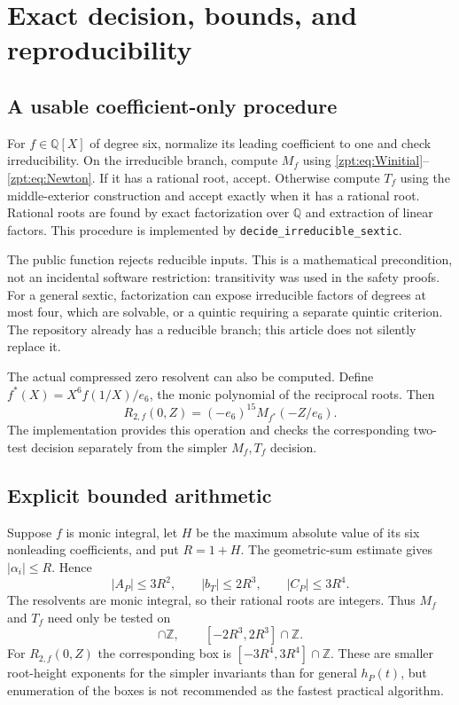 \documentclass[11pt,letterpaper]{article}
\numberwithin{equation}{section}
\theoremstyle{definition}
\theoremstyle{remark}
\newcommand{\QQ}{\mathbb Q}
\newcommand{\ZZ}{\mathbb Z}
\newcommand{\code}[1]{\texttt{\small #1}}
\begin{document}
\section{Exact decision, bounds, and reproducibility}
\label{zpt:sec:algorithm}
\subsection{A usable coefficient-only procedure}
For $f\in\QQ[X]$ of degree six, normalize its leading coefficient to one
and check irreducibility. On the irreducible branch, compute $M_f$ using
\eqref{zpt:eq:Winitial}--\eqref{zpt:eq:Newton}. If it has a rational root, accept.
Otherwise compute $T_f$ using the middle-exterior construction and accept
exactly when it has a rational root. Rational roots are found by exact
factorization over $\QQ$ and extraction of linear factors. This procedure
is implemented by \code{decide\_irreducible\_sextic}.

The public function rejects reducible inputs. This is a mathematical
precondition, not an incidental software restriction: transitivity was
used in the safety proofs. For a general sextic, factorization can expose
irreducible factors of degrees at most four, which are solvable, or a
quintic requiring a separate quintic criterion. The repository already
has a reducible branch; this article does not silently replace it.

The actual compressed zero resolvent can also be computed. Define
$f^*(X)=X^6f(1/X)/e_6$, the monic polynomial of the reciprocal roots.
Then
\begin{equation}
 R_{2,f}(0,Z)=(-e_6)^{15}M_{f^*}(-Z/e_6).\label{zpt:eq:zero-implementation}
\end{equation}
The implementation provides this operation and checks the corresponding
two-test decision separately from the simpler $M_f,T_f$ decision.

\subsection{Explicit bounded arithmetic}
Suppose $f$ is monic integral, let $H$ be the maximum absolute value of
its six nonleading coefficients, and put $R=1+H$. The geometric-sum
estimate gives $|\alpha_i|\le R$. Hence
\begin{equation}
 |A_P|\le3R^2,\qquad |b_T|\le2R^3,\qquad |C_P|\le3R^4.
 \label{zpt:eq:bounds}
\end{equation}
The resolvents are monic integral, so their rational roots are integers.
Thus $M_f$ and $T_f$ need only be tested on
\begin{equation}
 [-3R^2,3R^2]\cap\ZZ,\qquad[-2R^3,2R^3]\cap\ZZ.\label{zpt:eq:boxes}
\end{equation}
For $R_{2,f}(0,Z)$ the corresponding box is $[-3R^4,3R^4]\cap\ZZ$.
These are smaller root-height exponents for the simpler invariants than
for general $h_P(t)$, but enumeration of the boxes is not recommended as
the fastest practical algorithm.
\end{document}
